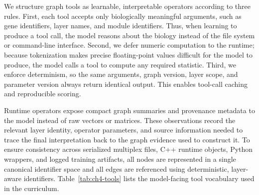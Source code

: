 We structure graph tools as learnable, interpretable operators according to three rules. First, each tool accepts only biologically meaningful arguments, such as gene identifiers, layer names, and module identifiers. Thus, when learning to produce a tool call, the model reasons about the biology instead of the file system or command-line interface. Second, we defer numeric computation to the runtime; because tokenization makes precise floating-point values difficult for the model to produce, the model calls a tool to compute any required statistic. Third, we enforce determinism, so the same arguments, graph version, layer scope, and parameter version always return identical output. This enables tool-call caching and reproducible scoring.

Runtime operators expose compact graph summaries and provenance metadata to the model instead of raw vectors or matrices. These observations record the relevant layer identity, operator parameters, and source information needed to trace the final interpretation back to the graph evidence used to construct it. To ensure consistency across serialized multiplex files, C++ runtime objects, Python wrappers, and logged training artifacts, all nodes are represented in a single canonical identifier space and all edges are referenced using deterministic, layer-aware identifiers. Table~\ref{tab:ch4-tools} lists the model-facing tool vocabulary used in the curriculum.

